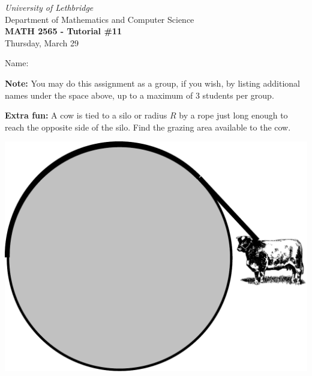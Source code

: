 \documentclass[12pt]{article}
\newcommand{\skipline}{\vspace{12pt}}
\begin{document}
\author{Instructor: Sean Fitzpatrick}
\thispagestyle{empty}
\begin{center}
\emph{University of Lethbridge}\\
Department of Mathematics and Computer Science\\
{\bf MATH 2565 - Tutorial \#11}\\
Thursday, March 29
\end{center}
\skipline \skipline \skipline \noindent \skipline

\skipline
Name:\underline{\hspace{348pt}}\\
\skipline

\vspace{2cm}

\textbf{Note:} You may do this assignment as a group, if you wish, by listing additional names under the space above, up to a maximum of 3 students per group.

\vspace*{\fill}

\begin{multicols}{2}
\textbf{Extra fun:} A cow is tied to a silo or radius $R$ by a rope just long enough to reach the opposite side of the silo. Find the grazing area available to the cow.

\begin{center}
\includegraphics[width=0.9\columnwidth]{cowpic}
\end{center}

\end{multicols}


\newpage
\end{document}
